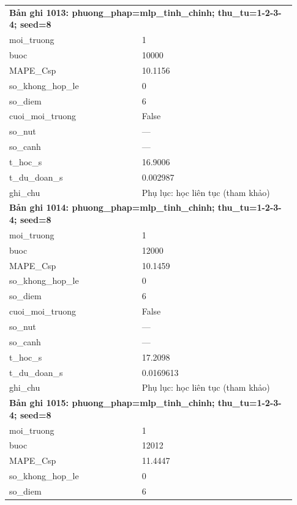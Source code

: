 \begin{longtable}{p{0.43\linewidth}p{0.50\linewidth}}
\midrule
\multicolumn{2}{p{0.95\linewidth}}{\textbf{Bản ghi 1013: phuong\_phap=mlp\_tinh\_chinh; thu\_tu=1-2-3-4; seed=8}} \\
moi\_\allowbreak truong & 1 \\
buoc & 10000 \\
MAPE\_\allowbreak Csp & 10.1156 \\
so\_\allowbreak khong\_\allowbreak hop\_\allowbreak le & 0 \\
so\_\allowbreak diem & 6 \\
cuoi\_\allowbreak moi\_\allowbreak truong & False \\
so\_\allowbreak nut & — \\
so\_\allowbreak canh & — \\
t\_\allowbreak hoc\_\allowbreak s & 16.9006 \\
t\_\allowbreak du\_\allowbreak doan\_\allowbreak s & 0.002987 \\
ghi\_\allowbreak chu & Phụ lục: học liên tục (tham khảo) \\
\midrule
\multicolumn{2}{p{0.95\linewidth}}{\textbf{Bản ghi 1014: phuong\_phap=mlp\_tinh\_chinh; thu\_tu=1-2-3-4; seed=8}} \\
moi\_\allowbreak truong & 1 \\
buoc & 12000 \\
MAPE\_\allowbreak Csp & 10.1459 \\
so\_\allowbreak khong\_\allowbreak hop\_\allowbreak le & 0 \\
so\_\allowbreak diem & 6 \\
cuoi\_\allowbreak moi\_\allowbreak truong & False \\
so\_\allowbreak nut & — \\
so\_\allowbreak canh & — \\
t\_\allowbreak hoc\_\allowbreak s & 17.2098 \\
t\_\allowbreak du\_\allowbreak doan\_\allowbreak s & 0.0169613 \\
ghi\_\allowbreak chu & Phụ lục: học liên tục (tham khảo) \\
\midrule
\multicolumn{2}{p{0.95\linewidth}}{\textbf{Bản ghi 1015: phuong\_phap=mlp\_tinh\_chinh; thu\_tu=1-2-3-4; seed=8}} \\
moi\_\allowbreak truong & 1 \\
buoc & 12012 \\
MAPE\_\allowbreak Csp & 11.4447 \\
so\_\allowbreak khong\_\allowbreak hop\_\allowbreak le & 0 \\
so\_\allowbreak diem & 6 \\

\end{longtable}
